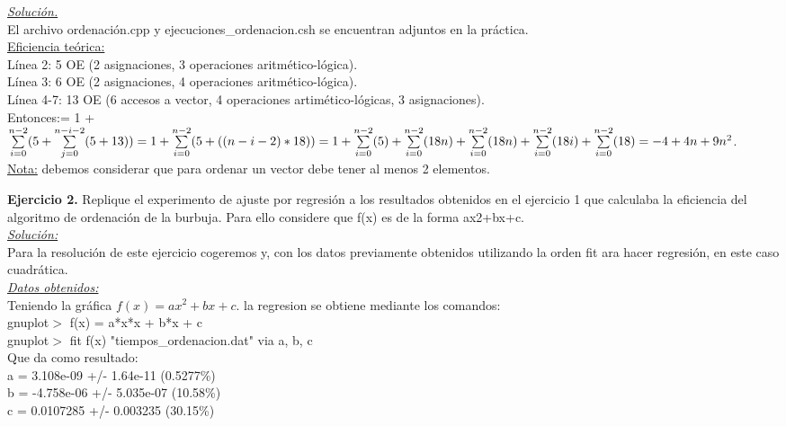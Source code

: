 \documentclass[titlepage, 12pt,a4paper]{article}
\begin{document}
\underline{\emph{Solución.}}\\
El archivo ordenación.cpp y ejecuciones\_ordenacion.csh se encuentran adjuntos en la práctica.\\

\underline{Eficiencia teórica:} \\
	Línea 2: 5 OE (2 asignaciones, 3 operaciones aritmético-lógica).\\
	Línea 3: 6 OE (2 asignaciones, 4 operaciones aritmético-lógica).\\
	Línea 4-7: 13 OE (6 accesos a vector, 4 operaciones artimético-lógicas, 3 asignaciones).\\

Entonces:= 1 + $\sum\limits_{i=0}^{n-2}(5+\sum\limits_{j=0}^{n-i-2}(5+13))= 1 + \sum\limits_{i=0}^{n-2}(5+((n-i-2)*18))= \\
1 + \sum\limits_{i=0}^{n-2}(5) + \sum\limits_{i=0}^{n-2}(18n)+\sum\limits_{i=0}^{n-2}(18n)+ \sum\limits_{i=0}^{n-2}(18i) + \sum\limits_{i=0}^{n-2}(18) = -4 + 4n + 9 n^2$.\\

\small{\underline{Nota:} debemos considerar que para ordenar un vector debe tener al menos 2 elementos.}

\newpage
\textbf{\large Ejercicio 2.} Replique el experimento de ajuste por regresión a los resultados obtenidos en el ejercicio
1 que calculaba la eficiencia del algoritmo de ordenación de la burbuja. Para ello
considere que f(x) es de la forma ax2+bx+c. \\


\underline{\emph{Solución:}}\\
Para la resolución de este ejercicio cogeremos y, con los datos previamente obtenidos utilizando la orden fit ara hacer regresión, en este caso cuadrática. \\

 \underline{\emph{Datos obtenidos:}}\\
 Teniendo la gráfica $f(x)=ax^2 + bx + c.$ la regresion se obtiene mediante los comandos:\\
gnuplot$>$ f(x) = a*x*x + b*x + c \\
 gnuplot$>$ fit f(x) "tiempos\_ordenacion.dat" via a, b, c\\
 
 Que da como resultado: \\
a    = 3.108e-09      +/- 1.64e-11     (0.5277\%)\\
b    = -4.758e-06     +/- 5.035e-07    (10.58\%)\\
c    = 0.0107285      +/- 0.003235     (30.15\%)\\
\end{document}
